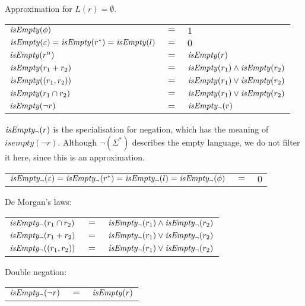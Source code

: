 \needspace{5cm}
\begin{defn}
   \label{defn-isempty}
   Approximation for $L(r) = \emptyset$.

   \begin{tabular}{lll}
      $\mathit{isEmpty}(\phi)$	& 	$=$ & $1$ \\
      $\mathit{isEmpty}(\varepsilon) = \mathit{isEmpty}(r^*) = \mathit{isEmpty}(l)$
         & $=$ & $0$ \\
      $\mathit{isEmpty}(r^n)$		& $=$ & $\mathit{isEmpty}(r)$ \\
      $\mathit{isEmpty}(r_1 + r_2)$	& $=$ & $\mathit{isEmpty}(r_1) \wedge \mathit{isEmpty}(r_2)$ \\
      $\mathit{isEmpty}((r_1, r_2))$	& $=$ & $\mathit{isEmpty}(r_1) \vee \mathit{isEmpty}(r_2)$ \\
      $\mathit{isEmpty}(r_1 \cap r_2)$	& $=$ & $\mathit{isEmpty}(r_1) \vee \mathit{isEmpty}(r_2)$ \\
      $\mathit{isEmpty}(\neg r)$	& $=$ & $\mathit{isEmpty_\neg}(r)$ \\
   \end{tabular}

   $\mathit{isEmpty_\neg}(r)$ is the specialisation for negation, which has the meaning of
   $isempty(\neg r)$. Although $\neg(\Sigma^*)$ describes the empty language, we
   do not filter it here, since this is an approximation.

   \begin{tabular}{lll}
      $\mathit{isEmpty_\neg}(\varepsilon) = \mathit{isEmpty_\neg}(r^*) = \mathit{isEmpty_\neg}(l) = \mathit{isEmpty_\neg}(\phi)$	& $=$ & $0$ \\
   \end{tabular}

   De Morgan's laws:

   \begin{tabular}{lll}
      $\mathit{isEmpty_\neg}(r_1 \cap r_2)$	& $=$ & $\mathit{isEmpty_\neg}(r_1) \wedge \mathit{isEmpty_\neg}(r_2)$ \\
      $\mathit{isEmpty_\neg}(r_1 + r_2)$		& $=$ & $\mathit{isEmpty_\neg}(r_1) \vee \mathit{isEmpty_\neg}(r_2)$ \\
      $\mathit{isEmpty_\neg}((r_1, r_2))$		& $=$ & $\mathit{isEmpty_\neg}(r_1) \vee \mathit{isEmpty_\neg}(r_2)$ \\
   \end{tabular}

   Double negation:

   \begin{tabular}{lll}
      $\mathit{isEmpty_\neg}(\neg r)$	& $=$ & $\mathit{isEmpty}(r)$ \\
   \end{tabular}
\end{defn}

